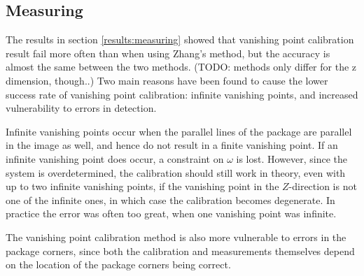 


\subsection{Measuring}
The results in section \ref{results:measuring} showed that vanishing point calibration result fail more often than when using Zhang's method, but the accuracy is almost the same between the two methods. (TODO: methods only differ for the z dimension, though..) %
Two main reasons have been found to cause the lower success rate of vanishing point calibration: infinite vanishing points, and increased vulnerability to errors in detection.

Infinite vanishing points occur when the parallel lines of the package are parallel in the image as well, and hence do not result in a finite vanishing point. 
If an infinite vanishing point does occur, a constraint on $\omega$ is lost.
However, since the system is overdetermined, the calibration should still work in theory, even with up to two infinite vanishing points, if the vanishing point in the $Z$-direction is not one of the infinite ones, in which case the calibration becomes degenerate.
In practice the error was often too great, when one vanishing point was infinite. %

The vanishing point calibration method is also more vulnerable to errors in the package corners, since both the calibration and measurements themselves depend on the location of the package corners being correct.

